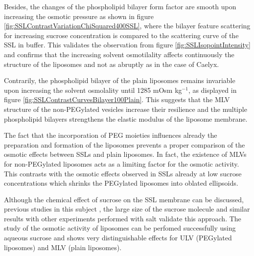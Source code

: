 Besides, the changes of the phospholipid bilayer form factor are smooth upon increasing the osmotic pressure as shown in figure \ref{fig:SSLContrastVariationChiSquared400SSL}, where the bilayer feature scattering for increasing sucrose concentration is compared to the scattering curve of the SSL in buffer. This validates the observation from figure \ref{fig:SSLIsopointIntensity} and confirms that the increasing solvent osmotilality affects continuously the structure of the liposomes and not as abruptly as in the case of Caelyx.

Contrarily, the phospholipid bilayer of the plain liposomes remains invariable upon increasing the solvent osmolality until 1285 mOsm kg$^{-1}$, as displayed in figure \ref{fig:SSLContrastCurvesBilayer100Plain}. This suggests that the MLV structure of the non-PEGylated vesicles increase their resilience and the multiple phospholipid bilayers strengthens the elastic modulus of the liposome membrane.

The fact that the incorporation of PEG moieties influences already the preparation and formation of the liposomes prevents a proper comparison of the osmotic effects between SSLs and plain liposomes. In fact, the existence of MLVs for non-PEGylated liposomes acts as a limiting factor for the osmotic activity. This contrasts with the osmotic effects observed in SSLs already at low sucrose concentrations which shrinks the PEGylated liposomes into oblated ellipsoids. 

Although the chemical effect of sucrose on the SSL membrane can be discussed, previous studies in this subject \cite{kiselev_does_2003, kiselev_sucrose_2001, kiselev_sucrose_2001-1}, the large size of the sucrose molecule and similar results with other experiments performed with salt \cite{varga_osmotic_2014} validate this approach. The study of the osmotic activity of liposomes can be perfomed successfully using aqueous sucrose and shows very distinguishable effects for ULV (PEGylated liposomes) and MLV (plain liposomes).



